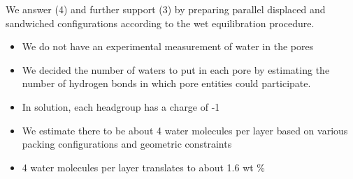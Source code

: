 \documentclass{article}
\begin{document}
  We answer (4) and further support (3) by preparing parallel displaced and
  sandwiched configurations according to the wet equilibration procedure.
  \begin{itemize}
	\item We do not have an experimental measurement of water in the pores
	\item We decided the number of waters to put in each pore by estimating
        the number of hydrogen bonds in which pore entities could participate.
	\item In solution, each headgroup has a charge of -1
	\item We estimate there to be about 4 water molecules per layer based 
	on various packing configurations and geometric constraints
	\item 4 water molecules per layer translates to about 1.6 wt \%
  \end{itemize}


 
\end{document}
